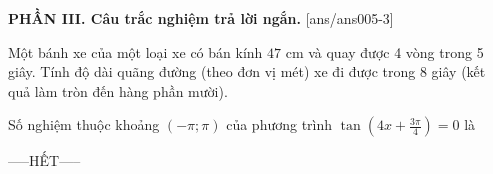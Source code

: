 \documentclass[12pt,a4paper]{article}
\begin{document}
{\bf PHẦN III. Câu trắc nghiệm trả lời ngắn.}
\setcounter{ex}{0}
[ans/ans005-3]
\begin{ex}
 Một bánh xe của một loại xe có bán kính ${47}$ cm và quay được 4 vòng trong 5 giây. Tính độ dài quãng đường (theo đơn vị mét) xe đi được trong 8 giây (kết quả làm tròn đến hàng phần mười). 

\end{ex}

\begin{ex}
 Số nghiệm thuộc khoảng $(- \pi;\pi)$ của phương trình $\tan \left(4 x + \frac{3 \pi}{4}\right)=0$ là

\end{ex}


 \begin{center}
-----HẾT-----
\end{center}

\newpage 
\end{document}
